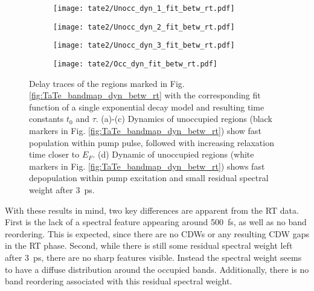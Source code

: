 \begin{figure}[b!]
	\centering
	\begin{subfigure}[b]{0.24\textwidth}
		\texttt{[image: tate2/Unocc\_dyn\_1\_fit\_betw\_rt.pdf]}
		\caption{}
	\end{subfigure}
	\begin{subfigure}[b]{0.24\textwidth}
		\texttt{[image: tate2/Unocc\_dyn\_2\_fit\_betw\_rt.pdf]}
		\caption{}
	\end{subfigure}
	\begin{subfigure}[b]{0.24\textwidth}
		\texttt{[image: tate2/Unocc\_dyn\_3\_fit\_betw\_rt.pdf]}
		\caption{}
	\end{subfigure}
	\begin{subfigure}[b]{0.24\textwidth}
		\texttt{[image: tate2/Occ\_dyn\_fit\_betw\_rt.pdf]}
		\caption{}
	\end{subfigure}
	\caption{
		Delay traces of the regions marked in Fig. \ref{fig:TaTe_bandmap_dyn_betw_rt} with the corresponding fit function of a single exponential decay model and resulting time constants $t_0$ and $\tau$. (a)-(c) Dynamics of unoccupied regions (black markers in Fig. \ref{fig:TaTe_bandmap_dyn_betw_rt}) show fast population within pump pulse, followed with increasing relaxation time closer to $E_F$. (d) Dynamic of unoccupied regions (white markers in Fig. \ref{fig:TaTe_bandmap_dyn_betw_rt}) shows fast depopulation within pump excitation and small residual spectral weight after \SI{3}{\pico\second}.}
	\label{fig:TaTe_dyn_betw_rt}
\end{figure}

With these results in mind, two key differences are apparent from the RT data.
First is the lack of a spectral feature appearing around \SI{500}{\femto\second}, as well as no band reordering.
This is expected, since there are no CDWs or any resulting CDW gaps in the RT phase.
Second, while there is still some residual spectral weight left after \SI{3}{\pico\second}, there are no sharp features visible.
Instead the spectral weight seems to have a diffuse distribution around the occupied bands.
Additionally, there is no band reordering associated with this residual spectral weight.



